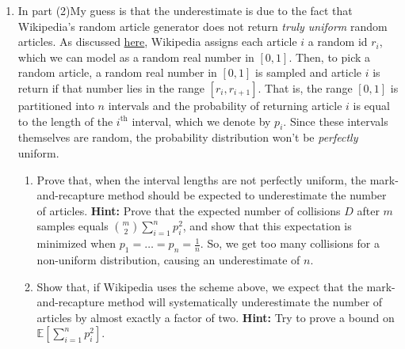 \documentclass[10pt]{article}
\newcommand{\E}{\mathbb{E}}
\begin{document}
\begin{enumerate}
\item In part (2)My guess is that the underestimate is due to the fact that 
Wikipedia's random article generator does not return \emph{truly uniform} random articles. As discussed \href{https://en.wikipedia.org/wiki/Wikipedia:FAQ/Technical#random}{here}, Wikipedia assigns each article $i$ a random id $r_i$, which we can model as a random real number in $[0, 1]$. Then, to pick a random article, a random real number in $[0, 1]$ is sampled and article $i$ is return if that number lies in the range $[r_i, r_{i+1}].$ That is, the range $[0, 1]$ is partitioned into $n$ intervals and the probability of returning article $i$ is equal to the length of the $i^\text{th}$ interval, which we denote by $p_i$. Since these intervals themselves are random, the probability distribution won't be \emph{perfectly} uniform.
\begin{enumerate}
	\item Prove that, when the interval lengths are not perfectly uniform, the mark-and-recapture method should be expected to underestimate the number of articles. \textbf{Hint:} Prove that the expected number of collisions $D$ after $m$ samples equals $\binom{m}{2}\sum_{i=1}^n p_i^2$, and show that this expectation is minimized when $p_1 = \ldots = p_n = \frac{1}{n}$.  So, we get too many collisions for a non-uniform distribution, causing an underestimate of $n$.
	\item Show that, if Wikipedia uses the scheme above, we expect that the mark-and-recapture method will systematically underestimate the number of articles by almost exactly a factor of two. \textbf{Hint:} Try to prove a bound on $\E\left[\sum_{i=1}^n p_i^2\right]$. 
\end{enumerate}
\end{enumerate}


%
\end{document}
